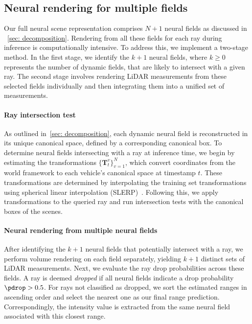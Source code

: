 \subsection{Neural rendering for multiple fields}\label{sec:neural_fields_composition}
Our full neural scene representation comprises $N+1$ neural fields as discussed in ~\cref{sec: decomposition}. Rendering from all these fields for each ray during inference is computationally intensive. To address this, we implement a two-stage method. In the first stage, we identify the $k+1$ neural fields, where $k \geq 0$ represents the number of dynamic fields, that are likely to intersect with a given ray. The second stage involves rendering LiDAR measurements from these selected fields individually and then integrating them into a unified set of measurements.


\paragraph{Ray intersection test}
As outlined in~\cref{sec: decomposition}, each dynamic neural field is reconstructed in its unique canonical space, defined by a corresponding canonical box. To determine neural fields intersecting with a ray at inference time, we begin by estimating the transformations $\{\mathbf{T}_t^v\}_{v=1}^N$, which convert coordinates from the world framework to each vehicle's canonical space at timestamp $t$. These transformations are determined by interpolating the training set transformations using spherical linear interpolation (SLERP)~\cite{10.1145/325334.325242}. Following this, we apply transformations to the queried ray and run intersection tests with the canonical boxes of the scenes. 


\paragraph{Neural rendering from multiple neural fields}
 After identifying the $k+1$ neural fields that potentially intersect with a ray, we perform volume rendering on each field separately, yielding $k+1$ distinct sets of LiDAR measurements. Next, we evaluate the ray drop probabilities across these fields. A ray is deemed \textit{dropped} if all neural fields indicate a drop probability $\pdrop > 0.5$. For rays not classified as dropped, we sort the estimated ranges in ascending order and select the nearest one as our final range prediction. Correspondingly, the intensity value is extracted from the same neural field associated with this closest range.
